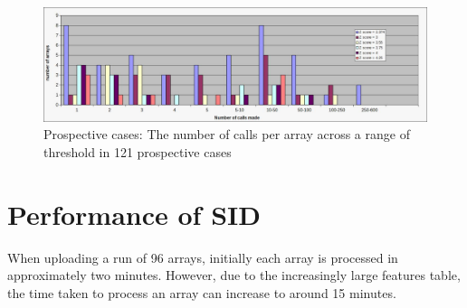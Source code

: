 \newpage
\begin{figure}[h]
\centering
\includegraphics[width=1\linewidth]{./Figures/prospectivesamplecalls}
\caption{Prospective cases: The number of calls per array across a range of threshold in 121 prospective cases}
\label{fig:prospectivesamplecalls}
\end{figure}


\begin{table}[h]
\centering
\caption[Prospective cases: The number and size of calls]{Prospective cases: The average and maximum number of probes within a call during analysis of 121 prospective arrays.}
\label{tab:prosepectivecalls}
\end{table}

\section{Performance of SID}
When uploading a run of 96 arrays, initially each array is processed in approximately two minutes. However, due to the increasingly large features table, the time taken to process an array can increase to around 15 minutes.